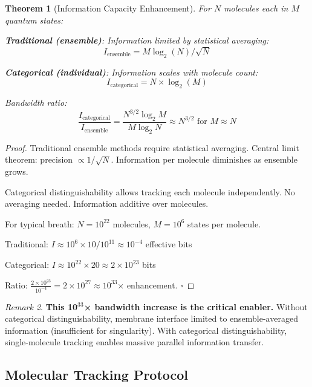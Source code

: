 \documentclass[11pt,a4paper]{article}
\newtheorem{theorem}{Theorem}[section]
\theoremstyle{definition}
\theoremstyle{remark}
\newtheorem{remark}[theorem]{Remark}
\begin{document}
\begin{theorem}[Information Capacity Enhancement]
\label{thm:bandwidth}
For $N$ molecules each in $M$ quantum states:

\textbf{Traditional (ensemble)}: Information limited by statistical averaging:
\begin{equation}
I_{\text{ensemble}} = M \log_2(N) / \sqrt{N}
\end{equation}

\textbf{Categorical (individual)}: Information scales with molecule count:
\begin{equation}
I_{\text{categorical}} = N \times \log_2(M)
\end{equation}

Bandwidth ratio:
\begin{equation}
\frac{I_{\text{categorical}}}{I_{\text{ensemble}}} = \frac{N^{3/2} \log_2 M}{M \log_2 N} \approx N^{3/2} \text{ for } M \approx N
\end{equation}
\end{theorem}

\begin{proof}
Traditional ensemble methods require statistical averaging. Central limit theorem: precision $\propto 1/\sqrt{N}$. Information per molecule diminishes as ensemble grows.

Categorical distinguishability allows tracking each molecule independently. No averaging needed. Information additive over molecules.

For typical breath: $N = 10^{22}$ molecules, $M = 10^6$ states per molecule.

Traditional: $I \approx 10^6 \times 10 / 10^{11} \approx 10^{-4}$ effective bits

Categorical: $I \approx 10^{22} \times 20 \approx 2 \times 10^{23}$ bits

Ratio: $\frac{2 \times 10^{23}}{10^{-4}} = 2 \times 10^{27} \approx 10^{33}$× enhancement. $\square$
\end{proof}

\begin{remark}
\textbf{This 10$^{33}$× bandwidth increase is the critical enabler.} Without categorical distinguishability, membrane interface limited to ensemble-averaged information (insufficient for singularity). With categorical distinguishability, single-molecule tracking enables massive parallel information transfer.
\end{remark}

\subsection{Molecular Tracking Protocol}
\end{document}
